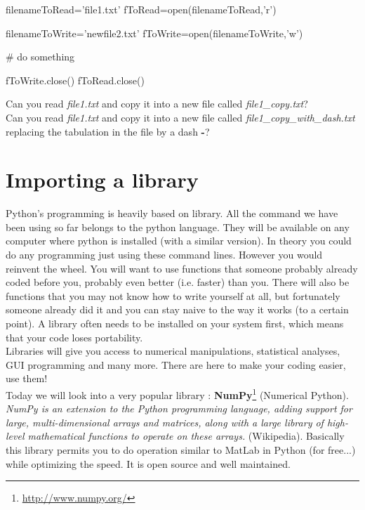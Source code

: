 \documentclass[article,10pt]{scrartcl}
\begin{document}
\begin{python}
filenameToRead='file1.txt'
fToRead=open(filenameToRead,'r')

filenameToWrite='newfile2.txt'
fToWrite=open(filenameToWrite,'w')

# do something

fToWrite.close()
fToRead.close()
\end{python}

Can you read \textit{file1.txt} and copy it into a new file called \textit{file1\_copy.txt}?\\
Can you read \textit{file1.txt} and copy it into a new file called \textit{file1\_copy\_with\_dash.txt} replacing the tabulation in the file by a dash \textbf{-}? \\

\section*{Importing a library}
Python's programming is heavily based on library. All the command we have been using so far belongs to the python language. They will be available on any computer where python is installed (with a similar version). In theory you could do any programming just using these command lines. However you would reinvent the wheel. You will want to use functions that someone probably already coded before you, probably even better (i.e. faster) than you. There will also be functions that you may not know how to write yourself at all, but fortunately someone already did it and you can stay naive to the way it works (to a certain point). A library often needs to be installed on your system first, which means that your code loses portability. \\
Libraries will give you access to numerical manipulations, statistical analyses, GUI programming and many more. There are here to make your coding easier, use them!
\\
Today we will look into a very popular library : \textbf{NumPy}\footnote{\url{http://www.numpy.org/}} (Numerical Python). \textit{NumPy is an extension to the Python programming language, adding support for large, multi-dimensional arrays and matrices, along with a large library of high-level mathematical functions to operate on these arrays.} (Wikipedia). Basically this library permits you to do operation similar to MatLab in Python (for free...) while optimizing the speed. It is open source and well maintained.\\
\end{document}
